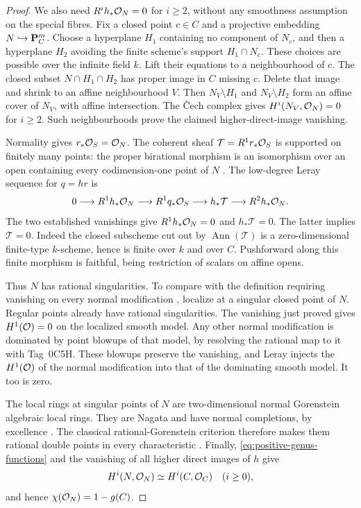 \begin{proof}
We also need $R^ih_*\mathcal O_N=0$ for $i\geq2$, without any smoothness
assumption on the special fibres. Fix a closed point $c\in C$ and a
projective embedding $N\hookrightarrow\mathbf P^m_C$.
Choose a hyperplane $H_1$ containing no component of $N_c$, and then
a hyperplane $H_2$ avoiding the finite scheme's support
$H_1\cap N_c$. These choices are possible over the infinite field $k$.
Lift their equations to a neighbourhood of $c$. The closed subset
$N\cap H_1\cap H_2$ has proper image in $C$ missing $c$.
Delete that image and shrink to an affine neighbourhood $V$.
Then $N_V\setminus H_1$ and $N_V\setminus H_2$ form an affine cover
of $N_V$, with affine intersection. The \v{C}ech complex gives
$H^i(N_V,\mathcal O_N)=0$ for $i\geq2$. Such neighbourhoods prove the
claimed higher-direct-image vanishing.

Normality gives $r_*\mathcal O_S=\mathcal O_N$. The coherent sheaf
$\mathcal T=R^1r_*\mathcal O_S$ is supported on finitely many points:
the proper birational morphism is an isomorphism over an open
containing every codimension-one point of $N$
\cite[Tag~0BFP]{Stacks}.
The low-degree Leray sequence for $q=hr$ is
\[
 0\longrightarrow R^1h_*\mathcal O_N\longrightarrow R^1q_*\mathcal O_S
 \longrightarrow h_*\mathcal T\longrightarrow R^2h_*\mathcal O_N.
\]
The two established vanishings give $R^1h_*\mathcal O_N=0$ and
$h_*\mathcal T=0$. The latter implies $\mathcal T=0$.
Indeed the closed subscheme cut out by
$\operatorname{Ann}(\mathcal T)$ is a zero-dimensional finite-type
$k$-scheme, hence is finite over $k$ and over $C$.
Pushforward along this finite morphism is faithful, being restriction
of scalars on affine opens.

Thus $N$ has rational singularities. To compare with the definition
requiring vanishing on every normal modification
\cite[Tag~0B4N]{Stacks}, localize at a singular closed point of $N$.
Regular points already have rational singularities.
The vanishing just proved gives $H^1(\mathcal O)=0$ on the localized smooth
model. Any other normal modification is dominated by point blowups
of that model, by resolving the rational map to it with Tag~0C5H.
These blowups preserve the vanishing, and Leray injects the
$H^1(\mathcal O)$ of the normal modification into that of the dominating
smooth model. It too is zero.

The local rings at singular points of $N$ are two-dimensional
normal Gorenstein algebraic local rings. They are Nagata and have
normal completions, by excellence
\cite[IV, 7.8.3(ii), (iii), (v), (vi)]{EGA}.
The classical rational-Gorenstein criterion therefore makes them
rational double points in every characteristic
\cite[Sections~54.9 and~54.12, Tags~0B4V and~0BGB]{Stacks}.
Finally, \eqref{eq:positive-genus-functions} and the vanishing of all
higher direct images of $h$ give
\[
 H^i(N,\mathcal O_N)\simeq H^i(C,\mathcal O_C)\quad(i\geq0),
\]
and hence $\chi(\mathcal O_N)=1-g(C)$.


\end{proof}
